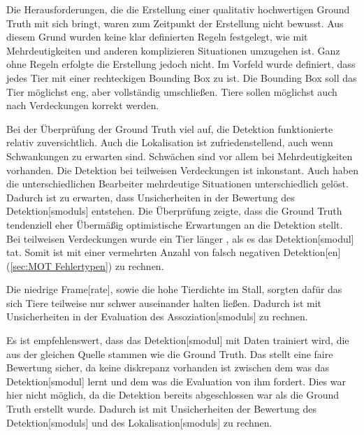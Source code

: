 Die Herausforderungen, die die Erstellung einer qualitativ hochwertigen \gls{Ground Truth} mit sich bringt, waren zum Zeitpunkt der Erstellung nicht bewusst. Aus diesem Grund wurden keine klar definierten Regeln festgelegt, wie mit Mehrdeutigkeiten und anderen komplizieren Situationen umzugehen ist. Ganz ohne Regeln erfolgte die Erstellung jedoch nicht. Im Vorfeld wurde definiert, dass jedes Tier mit einer rechteckigen \gls{Bounding Box} zu  ist. Die \gls{Bounding Box} soll das Tier möglichst eng, aber vollständig umschließen. Tiere sollen möglichst auch nach Verdeckungen korrekt  werden. \par 

Bei der Überprüfung der \gls{Ground Truth} viel auf, die \gls{Detektion} funktionierte relativ zuversichtlich. Auch die \gls{Lokalisation} ist zufriedenstellend, auch wenn Schwankungen zu erwarten sind. Schwächen sind vor allem bei Mehrdeutigkeiten vorhanden. Die \gls{Detektion} bei teilweisen Verdeckungen ist inkonstant. Auch haben die unterschiedlichen Bearbeiter mehrdeutige Situationen unterschiedlich gelöst. Dadurch ist zu erwarten, dass Unsicherheiten in der Bewertung des \gls{Detektion}[smoduls] entstehen. Die Überprüfung zeigte, dass die \gls{Ground Truth} tendenziell eher Übermäßig optimistische Erwartungen an die \gls{Detektion} stellt. Bei teilweisen Verdeckungen wurde ein Tier länger , als es das \gls{Detektion}[smodul] tat. Somit ist mit einer vermehrten Anzahl von falsch negativen \gls{Detektion}[en] (\autoref{sec:MOT Fehlertypen}) zu rechnen. \par

Die niedrige \gls{Frame}[rate], sowie die hohe Tierdichte im Stall, sorgten dafür das sich Tiere teilweise nur schwer auseinander halten ließen. Dadurch ist mit Unsicherheiten in der Evaluation des \gls{Assoziation}[smoduls] zu rechnen. 

Es ist empfehlenswert, dass das \gls{Detektion}[smodul] mit Daten trainiert wird, die aus der gleichen Quelle stammen wie die \gls{Ground Truth}. Das stellt eine faire Bewertung sicher, da keine diskrepanz vorhanden ist zwischen dem was das \gls{Detektion}[smodul] lernt und dem was die Evaluation von ihm fordert. Dies war hier nicht möglich, da die \gls{Detektion} bereits abgeschlossen war als die \gls{Ground Truth} erstellt wurde. Dadurch ist mit Unsicherheiten der Bewertung des \gls{Detektion}[smoduls] und des \gls{Lokalisation}[smoduls] zu rechnen.\par

